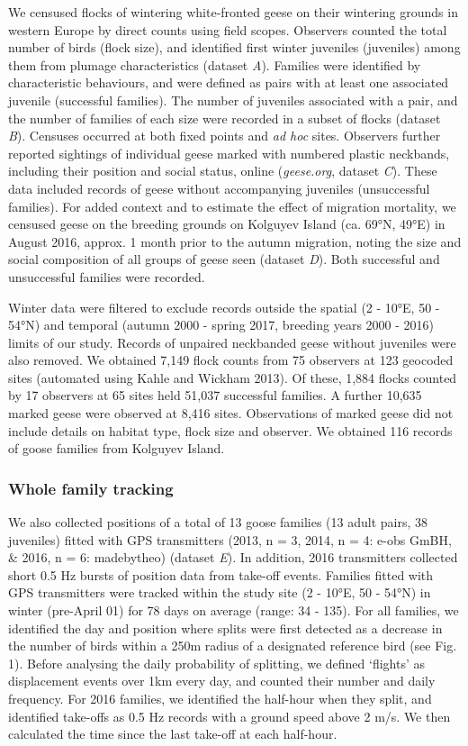 \documentclass[10pt,twocolumn]{paper}
\begin{document}
We censused flocks of wintering white-fronted geese on their wintering
grounds in western Europe by direct counts using field scopes. Observers
counted the total number of birds (flock size), and identified first
winter juveniles (juveniles) among them from plumage characteristics
(dataset \emph{A}). Families were identified by characteristic
behaviours, and were defined as pairs with at least one associated
juvenile (successful families). The number of juveniles associated with
a pair, and the number of families of each size were recorded in a
subset of flocks (dataset \emph{B}). Censuses occurred at both fixed
points and \emph{ad hoc} sites. Observers further reported sightings of
individual geese marked with numbered plastic neckbands, including their
position and social status, online (\emph{geese.org}, dataset \emph{C}).
These data included records of geese without accompanying juveniles
(unsuccessful families). For added context and to estimate the effect of
migration mortality, we censused geese on the breeding grounds on
Kolguyev Island (ca. 69°N, 49°E) in August 2016, approx. 1 month prior
to the autumn migration, noting the size and social composition of all
groups of geese seen (dataset \emph{D}). Both successful and
unsuccessful families were recorded.

Winter data were filtered to exclude records outside the spatial (2 -
10°E, 50 - 54°N) and temporal (autumn 2000 - spring 2017, breeding years
2000 - 2016) limits of our study. Records of unpaired neckbanded geese
without juveniles were also removed. We obtained 7,149 flock counts from
75 observers at 123 geocoded sites (automated using Kahle and Wickham
2013). Of these, 1,884 flocks counted by 17 observers at 65 sites held
51,037 successful families. A further 10,635 marked geese were observed
at 8,416 sites. Observations of marked geese did not include details on
habitat type, flock size and observer. We obtained 116 records of goose
families from Kolguyev Island.

\subsubsection{Whole family tracking}\label{whole-family-tracking}

We also collected positions of a total of 13 goose families (13 adult
pairs, 38 juveniles) fitted with GPS transmitters (2013, n = 3, 2014, n
= 4: e-obs GmBH, \& 2016, n = 6: madebytheo) (dataset \emph{E}). In
addition, 2016 transmitters collected short 0.5 Hz bursts of position
data from take-off events. Families fitted with GPS transmitters were
tracked within the study site (2 - 10°E, 50 - 54°N) in winter (pre-April
01) for 78 days on average (range: 34 - 135). For all families, we
identified the day and position where splits were first detected as a
decrease in the number of birds within a 250m radius of a designated
reference bird (see Fig. 1). Before analysing the daily probability of
splitting, we defined `flights' as displacement events over 1km every
day, and counted their number and daily frequency. For 2016 families, we
identified the half-hour when they split, and identified take-offs as
0.5 Hz records with a ground speed above 2 m/s. We then calculated the
time since the last take-off at each half-hour.
\end{document}
